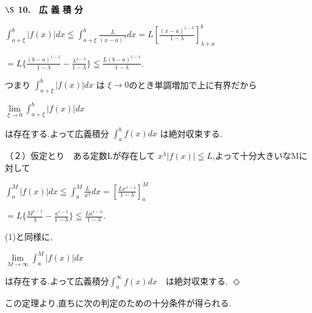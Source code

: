 \documentclass[11pt,uplatex,a5paper]{jsarticle} %
\begin{document}
\pagestyle{empty}
\setlength\parindent{0pt}

\newcommand{\absoluteFx}[0]{\int_{a + \xi}^b |f(x)| dx}




\begin{center}
    \textbf{$\S$ 10.　広 義 積 分}
\end{center}



\begin{center}
    
    $\absoluteFx \leqq\int_{a+\xi}^b\frac{L}{(x-a)^\lambda}dx=L\left[\frac{(x-a)^{1-\lambda}}{1-\lambda}\right]_{\lambda+a}^b$
    
    $=L\{ \frac{(b-a)^{1-\lambda}}{1-\lambda}-\frac{\lambda^{1-\lambda}}{1-\lambda}\}\leqq\frac{L(b-a)^{1-\lambda}}{1-\lambda}$.
   
\end{center}




つまり  $\absoluteFx$    は $\xi \rightarrow 0$のとき単調増加で上に有界だから


\begin{center}
    $\lim\limits_{\xi \to 0} \absoluteFx$
\end{center}


は存在する.よって広義積分 $\int_a^b f(x)dx$ は絶対収束する.


（２）仮定とり　ある定数Lが存在して $x^\lambda|f(x)|\leqq L$,よって十分大きいなMに対して


\begin{center}

    $\int_a^M |f(x)|dx \leqq \int_a^M \frac{L}{x^\lambda}dx=\left[\frac{Lx^{1-\lambda}}{1-\lambda}\right]_a^M$

    $=L\{\frac{M^{1-\lambda}}{\lambda}-\frac{a^{1-\lambda}}{1-\lambda}\}\leqq\frac{La^{1-\lambda}}{1-\lambda}$.

\end{center}


(1)と同様に,

\begin{center}

    $\lim\limits_{M \to \infty}\int_a^M|f(x) |dx$

\end{center}

は存在する.よって広義積分$\int_a^\infty f(x)dx $　は絶対収束する. $\Diamond$

この定理より,直ちに次の判定のための十分条件が得られる.
\end{document}
